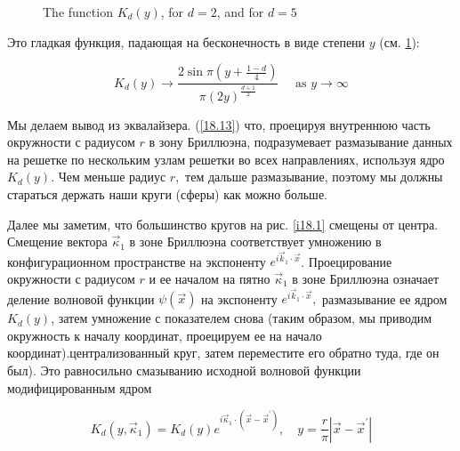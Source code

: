 \documentclass[main.tex]{subfiles}
\begin{document}
\begin{figure}[ht]
	\begin{center}
		\caption{
		\label{i18.2}  The function $K_d (y)$,  for $d = 2$, and  for $d = 5$}
	\end {center}
\end {figure}

Это гладкая функция, падающая на бесконечность в виде степени $y$ (см. \ref{i18.2}):

\begin{equation}\label{18.15}
	K_{d}(y) \longrightarrow \frac{2 \sin \pi\left(y+\frac{1-d}{4}\right)}{\pi(2 y)^{\frac{d+1}{2}}} \quad \text { as } y \rightarrow \infty
\end{equation}


Мы делаем вывод из эквалайзера. (\ref{18.13}) что, проецируя внутреннюю часть окружности с радиусом $r$ в зону Бриллюэна, подразумевает размазывание данных на решетке по нескольким узлам решетки во всех направлениях, используя ядро $K_{d}(y)$. Чем меньше радиус $r,$ тем дальше размазывание, поэтому мы должны стараться держать наши круги (сферы) как можно больше.

Далее мы заметим, что большинство кругов на рис. \ref{i18.1} смещены от центра. Смещение вектора $\vec{\kappa}_{1}$ в зоне Бриллюэна соответствует умножению в конфигурационном пространстве на экспоненту $e^{i \vec{k}_{1} \cdot \vec{x}}$. Проецирование окружности с радиусом $r$ и ее началом на пятно $\vec{\kappa}_{1}$ в зоне Бриллюэна означает деление волновой функции $\psi(\vec{x})$ на экспоненту $e^{i \vec{k}_{1} \cdot \vec{x}},$ размазывание ее ядром $K_{d}(y)$, затем умножение с показателем снова (таким образом, мы приводим окружность к началу координат, проецируем ее на начало координат).централизованный круг, затем переместите его обратно туда, где он был). Это равносильно смазыванию исходной волновой функции модифицированным ядром

\begin{equation}\label{18.16}
	K_{d}\left(y, \vec{\kappa}_{1}\right)=K_{d}(y) e^{i \vec{\kappa}_{1} \cdot\left(\vec{x}-\vec{x}^{\prime}\right)}, \quad y=\frac{r}{\pi}\left|\vec{x}-\vec{x}^{\prime}\right|
\end{equation}
\end{document}
